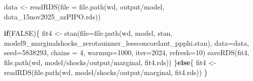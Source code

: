 \documentclass[
  letterpaper,
  DIV=11,
  numbers=noendperiod]{scrartcl}
\newenvironment{Shaded}{\begin{snugshade}}{\end{snugshade}}
\newcommand{\AttributeTok}[1]{\textcolor[rgb]{0.40,0.45,0.13}{#1}}
\newcommand{\ConstantTok}[1]{\textcolor[rgb]{0.56,0.35,0.01}{#1}}
\newcommand{\ControlFlowTok}[1]{\textcolor[rgb]{0.00,0.23,0.31}{\textbf{#1}}}
\newcommand{\DecValTok}[1]{\textcolor[rgb]{0.68,0.00,0.00}{#1}}
\newcommand{\FunctionTok}[1]{\textcolor[rgb]{0.28,0.35,0.67}{#1}}
\newcommand{\NormalTok}[1]{\textcolor[rgb]{0.00,0.23,0.31}{#1}}
\newcommand{\OtherTok}[1]{\textcolor[rgb]{0.00,0.23,0.31}{#1}}
\newcommand{\StringTok}[1]{\textcolor[rgb]{0.13,0.47,0.30}{#1}}
\begin{document}
\begin{Shaded}
\begin{Highlighting}[]
\NormalTok{data }\OtherTok{\textless{}{-}} \FunctionTok{readRDS}\NormalTok{(}\AttributeTok{file =} \FunctionTok{file.path}\NormalTok{(wd, }\StringTok{\textquotesingle{}output/model\textquotesingle{}}\NormalTok{, }\StringTok{\textquotesingle{}data\_15nov2025\_azPIPO.rds\textquotesingle{}}\NormalTok{))}

\ControlFlowTok{if}\NormalTok{(}\ConstantTok{FALSE}\NormalTok{)\{}
\NormalTok{  fit4 }\OtherTok{\textless{}{-}} \FunctionTok{stan}\NormalTok{(}\AttributeTok{file=}\FunctionTok{file.path}\NormalTok{(wd, }\StringTok{\textquotesingle{}model\textquotesingle{}}\NormalTok{, }\StringTok{\textquotesingle{}stan\textquotesingle{}}\NormalTok{, }\StringTok{\textquotesingle{}model9\_marginalshocks\_zerotauinner\_lessconcordant\_ppphi.stan\textquotesingle{}}\NormalTok{),}
            \AttributeTok{data=}\NormalTok{data, }\AttributeTok{seed=}\DecValTok{5838293}\NormalTok{, }\AttributeTok{chains =} \DecValTok{4}\NormalTok{,}
            \AttributeTok{warmup=}\DecValTok{1000}\NormalTok{, }\AttributeTok{iter=}\DecValTok{2024}\NormalTok{, }\AttributeTok{refresh=}\DecValTok{10}\NormalTok{)}
  \FunctionTok{saveRDS}\NormalTok{(fit4, }\FunctionTok{file.path}\NormalTok{(wd, }\StringTok{\textquotesingle{}model/shocks/output/marginal\textquotesingle{}}\NormalTok{, }\StringTok{\textquotesingle{}fit4.rds\textquotesingle{}}\NormalTok{))}
\NormalTok{\}}\ControlFlowTok{else}\NormalTok{\{}
\NormalTok{  fit4 }\OtherTok{\textless{}{-}} \FunctionTok{readRDS}\NormalTok{(}\FunctionTok{file.path}\NormalTok{(wd, }\StringTok{\textquotesingle{}model/shocks/output/marginal\textquotesingle{}}\NormalTok{, }\StringTok{\textquotesingle{}fit4.rds\textquotesingle{}}\NormalTok{))}
\NormalTok{\}}
\end{Highlighting}
\end{Shaded}

\linespread{2}
\end{document}
